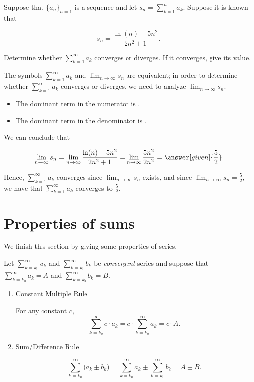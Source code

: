 \documentclass{ximera}
\begin{document}
\begin{example}
Suppose that $\{a_n\}_{n=1}$ is a sequence and let $s_n = \sum_{k=1}^n a_k$.  Suppose it is known that

\[
s_n = \frac{\ln(n)+5n^2}{2n^2+1}.
\]

Determine whether $\sum_{k=1}^{\infty} a_k$ converges or diverges.  If it converges, give its value.

\begin{explanation}
The symbols $\sum_{k=1}^{\infty} a_k$ and $\lim_{n \to \infty} s_n$ are equivalent; in order to determine whether $\sum_{k=1}^{\infty} a_k$ converges or diverges, we need to analyze $\lim_{n \to \infty} s_n$.  

\begin{itemize}
\item The dominant term in the numerator is .
\item The dominant term in the denominator is .
\end{itemize}
We can conclude that 

\[ \lim_{n \to \infty} s_n = \lim_{n \to \infty} \frac{\ln(n)+5n^2}{2n^2+1} =  \lim_{n \to \infty} \frac{5n^2}{2n^2} = \answer[given]{\frac{5}{2}}\]

Hence, $\sum_{k=1}^{\infty} a_k$ converges since  $\lim_{n \to \infty} s_n$ exists, and since  $\lim_{n \to \infty} s_n=\frac{5}{2}$, we have that $\sum_{k=1}^{\infty} a_k$ converges to $\frac{5}{2}$.
\end{explanation}

\end{example}

\section{Properties of sums}

We finish this section by giving some properties of series.

\begin{theorem}
  Let  $\sum_{k=k_0}^\infty a_k$ and  $\sum_{k=k_0}^\infty b_k$ be \emph{convergent} series and suppose that $
  \sum_{k=k_0}^\infty a_k = A$ and $\sum_{k=k_0}^\infty b_k =B.$
 
 \begin{enumerate}
\item Constant Multiple Rule 

For any constant $c$, \[\sum_{k=k_0}^\infty c\cdot a_k =
  c\cdot\sum_{k=k_0}^\infty a_k = c\cdot A.\]
\item Sum/Difference Rule 

\[\sum_{k=k_0}^\infty \big(a_k\pm b_k\big) =
  \sum_{k=k_0}^\infty a_k \pm \sum_{k=k_0}^\infty b_k = A \pm B.\]
\end{enumerate} 
\end{theorem}
\end{document}
